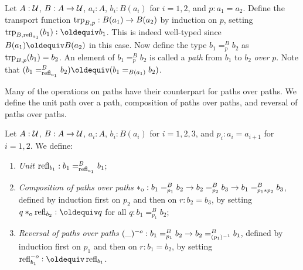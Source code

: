 \documentclass[a4paper,12pt]{amsart}
\begin{document}
\begin{definition}\label{def:pathover}
Let $A : \mathcal{U}$, $B : A \to \mathcal{U}$, $a_i:A$, $b_i:B(a_i)$ for $i=1,2$, and $p : a_1 = a_2$.
Define the transport function $\mathop{\mathrm{trp}_{B,p}} : B(a_1)\to B(a_2)$ by induction on $p$,
setting $\trp{B,\refl{a_1}}(b_1)\defeq b_1$. This is indeed well-typed since
$B(a_1)\jdeq B(a_2)$ in this case.
Now define the type $b_1 =^B_p b_2$ as $\mathop{\mathrm{trp}_{B,p}}(b_1) = b_2$.
An element of $b_1 =^B_p b_2$ is called
a \emph{path} from $b_1$ to $b_2$ \emph{over} $p$.
Note that $(b_1 =^B_{\refl{a_1}} b_2) \jdeq (b_1 =_{B(a_1)}  b_2)$.
\end{definition}

Many of the operations on paths have their counterpart for paths over paths.
We define the unit path over a path, composition of paths over paths, and reversal of paths over paths.

\begin{definition}\label{def:pathoveralgebra}
  Let $A : \mathcal{U}$, $B : A \to \mathcal{U}$, $a_i:A$, $b_i:B(a_i)$ for $i=1,2,3$, and
  $p_i : a_i = a_{i+1}$ for $i=1,2$. We define:
  \begin{enumerate}[topsep=3pt]
  \item \emph{Unit} $\mathop{{\mathrm{refl}}_{b_1}} : b_1 =^B_{\mathop{{\mathrm{refl}}_{a_1}}} b_1$;
  \item \emph{Composition of paths over paths} $*_{\mathrm{o}} : b_1 =^B_{p_1} b_2 \to b_2 =^B_{p_2} b_3 \to b_1 =^B_{p_1 * p_2} b_3$,
    defined by induction first on $p_2$ and then on $r: b_2 = b_3$, by
    setting $q \cto \refl{b_2} \defeq q$ for all $q: b_1 =^B_{p_1} b_2$;
  \item \emph{Reversal of paths over paths} $({\_})^{-o} : b_1 =^B_{p_1} b_2 \to b_2 =^B_{(p_1)^{-1}} b_1$,
    defined by induction first on $p_1$ and then on $r: b_1 = b_2$, by
    setting $\refloi{b_1} \defeq \refl{b_1}$.
  \end{enumerate}
\end{definition}
\end{document}
